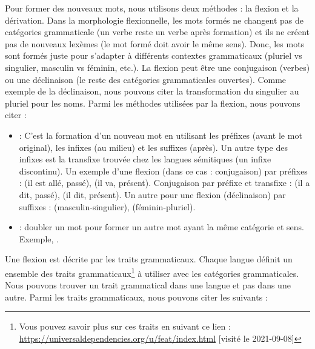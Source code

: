\documentclass{KodeBook}
\begin{document}
Pour former des nouveaux mots, nous utilisons deux méthodes : la flexion et la dérivation. 
Dans la morphologie flexionnelle, les mots formés ne changent pas de catégories grammaticale (un verbe reste un verbe après formation) et ils ne créent pas de nouveaux lexèmes (le mot formé doit avoir le même sens). 
Donc, les mots sont formés juste pour s'adapter à différents contextes grammaticaux (pluriel vs singulier, masculin vs féminin, etc.).
La flexion peut être une conjugaison (verbes) ou une déclinaison (le reste des catégories grammaticales ouvertes).
Comme exemple de la déclinaison, nous pouvons citer la transformation du singulier au pluriel pour les noms.
Parmi les méthodes utilisées par la flexion, nous pouvons citer :
\begin{itemize}
	\item {} : C'est la formation d'un nouveau mot en utilisant les préfixes (avant le mot original), les infixes (au milieu) et les suffixes (après).
	Un autre type des infixes est la transfixe trouvée chez les langues sémitiques (un infixe discontinu).
	Un exemple d'une flexion (dans ce cas : conjugaison) par préfixes :  (il est allé, passé),  (il va, présent).
	Conjugaison par préfixe et transfixe :  (il a dit, passé),  (il dit, présent).
	Un autre pour une flexion (déclinaison) par suffixes :  (masculin-singulier),  (féminin-pluriel).
	\item {} : doubler un mot pour former un autre mot ayant la même catégorie et sens. 
	Exemple, .
	
\end{itemize}
Une flexion est décrite par les traits grammaticaux. 
Chaque langue définit un ensemble des traits grammaticaux\footnote{Vous pouvez savoir plus sur ces traits en suivant ce lien : \url{https://universaldependencies.org/u/feat/index.html} [visité le 2021-09-08]} à utiliser avec les catégories grammaticales.
Nous pouvons trouver un trait grammatical dans une langue et pas dans une autre.
Parmi les traits grammaticaux, nous pouvons citer les suivants :
\end{document}

